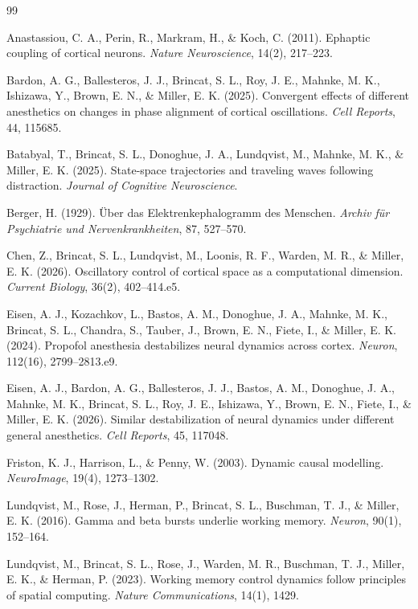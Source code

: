 \documentclass[11pt]{book}
\begin{document}
\begin{thebibliography}{99}

Anastassiou, C. A., Perin, R., Markram, H., \& Koch, C. (2011). Ephaptic coupling of cortical neurons. \textit{Nature Neuroscience}, 14(2), 217--223.

Bardon, A. G., Ballesteros, J. J., Brincat, S. L., Roy, J. E., Mahnke, M. K., Ishizawa, Y., Brown, E. N., \& Miller, E. K. (2025). Convergent effects of different anesthetics on changes in phase alignment of cortical oscillations. \textit{Cell Reports}, 44, 115685.

Batabyal, T., Brincat, S. L., Donoghue, J. A., Lundqvist, M., Mahnke, M. K., \& Miller, E. K. (2025). State-space trajectories and traveling waves following distraction. \textit{Journal of Cognitive Neuroscience}.

Berger, H. (1929). \"{U}ber das Elektrenkephalogramm des Menschen. \textit{Archiv f\"{u}r Psychiatrie und Nervenkrankheiten}, 87, 527--570.

Chen, Z., Brincat, S. L., Lundqvist, M., Loonis, R. F., Warden, M. R., \& Miller, E. K. (2026). Oscillatory control of cortical space as a computational dimension. \textit{Current Biology}, 36(2), 402--414.e5.

Eisen, A. J., Kozachkov, L., Bastos, A. M., Donoghue, J. A., Mahnke, M. K., Brincat, S. L., Chandra, S., Tauber, J., Brown, E. N., Fiete, I., \& Miller, E. K. (2024). Propofol anesthesia destabilizes neural dynamics across cortex. \textit{Neuron}, 112(16), 2799--2813.e9.

Eisen, A. J., Bardon, A. G., Ballesteros, J. J., Bastos, A. M., Donoghue, J. A., Mahnke, M. K., Brincat, S. L., Roy, J. E., Ishizawa, Y., Brown, E. N., Fiete, I., \& Miller, E. K. (2026). Similar destabilization of neural dynamics under different general anesthetics. \textit{Cell Reports}, 45, 117048.

Friston, K. J., Harrison, L., \& Penny, W. (2003). Dynamic causal modelling. \textit{NeuroImage}, 19(4), 1273--1302.

Lundqvist, M., Rose, J., Herman, P., Brincat, S. L., Buschman, T. J., \& Miller, E. K. (2016). Gamma and beta bursts underlie working memory. \textit{Neuron}, 90(1), 152--164.

Lundqvist, M., Brincat, S. L., Rose, J., Warden, M. R., Buschman, T. J., Miller, E. K., \& Herman, P. (2023). Working memory control dynamics follow principles of spatial computing. \textit{Nature Communications}, 14(1), 1429.


\end{thebibliography}
\end{document}
